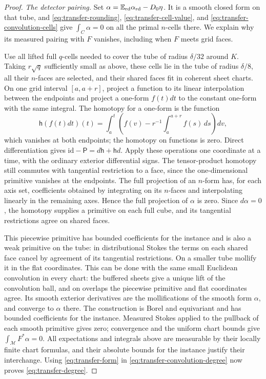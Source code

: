 \begin{proof}
\medskip\noindent\emph{The detector pairing.}
Set \(\alpha=\mathbb E_{\rm rd}\alpha_{\rm rd}-D_0\eta\).  It is a smooth
closed form on that tube, and \eqref{eq:transfer-rounding},
\eqref{eq:transfer-cell-value}, and
\eqref{eq:transfer-convolution-cells} give \(\int_C\alpha=0\) on all
the primal \(n\)-cells there.  We explain why its measured pairing
with \(F\) vanishes, including when \(F\) meets grid faces.

Use all lifted full \(q\)-cells needed to cover the tube of radius
\(\delta/32\) around \(K\).  Taking \(r\sqrt q\) sufficiently small
as above, these cells lie in the tube of radius \(\delta/8\), all
their \(n\)-faces are selected, and their shared faces fit in
coherent sheet charts.  On one grid interval \([a,a+r]\), project a
function to its linear interpolation between the endpoints and
project a one-form \(f(t)dt\) to the constant one-form with the same
integral.  The homotopy for a one-form is the function
\[
       \mathsf h(f(t)dt)(t)=\int_a^t
              \left(f(v)-r^{-1}\int_a^{a+r}f(s)\,ds\right)dv,
\]
which vanishes at both endpoints; the homotopy on functions is zero.
Direct differentiation gives \(\mathrm{id}-\mathsf P
=d\mathsf h+\mathsf h d\).  Apply these operations one coordinate
at a time, with the ordinary exterior differential signs.  The
tensor-product homotopy still commutes with tangential restriction
to a face, since the one-dimensional primitive vanishes at the
endpoints.  The full projection of an \(n\)-form has, for each
axis set, coefficients obtained by integrating on its \(n\)-faces
and interpolating linearly in the remaining axes.  Hence the full
projection of \(\alpha\) is zero.  Since \(d\alpha=0\), the
homotopy supplies a primitive on each full cube, and its tangential
restrictions agree on shared faces.

This piecewise primitive has bounded coefficients for the instance
and is also a weak primitive on the tube: in distributional Stokes
the terms on each shared face cancel by agreement of its tangential
restrictions.  On a smaller tube mollify it in the flat coordinates.
This can be done with the same small Euclidean convolution in every
chart: the buffered sheets give a unique lift of the convolution ball,
and on overlaps the piecewise primitive and flat coordinates agree.
Its smooth exterior derivatives are the mollifications of the smooth
form \(\alpha\), and converge to \(\alpha\) there.  The construction
is Borel and equivariant and has bounded coefficients for the instance.
Measured Stokes applied to the pullback of each smooth primitive gives
zero; convergence and the uniform chart bounds give
\(\int_{\mathcal M}F^*\alpha=0\).  All expectations and integrals
above are measurable by their locally finite chart formulas, and
their absolute bounds for the instance justify their interchange.
Using \eqref{eq:transfer-form} in
\eqref{eq:transfer-convolution-degree} now proves
\eqref{eq:transfer-degree}.
\end{proof}

